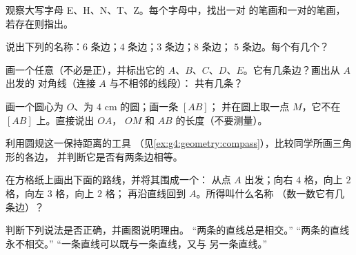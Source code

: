 \begin{exercise}[$\star$]\label{exo:g4:geometry:2}
观察大写字母 E、H、N、T、Z。每个字母中，找出一对
的笔画和一对的笔画，
若存在则指出。
\end{exercise}

\begin{exercise}[$\star$]\label{exo:g4:geometry:3}
说出下列的名称：$6$ 条边；$4$ 条边；$3$ 条边；$8$ 条边；
$5$ 条边。每个有几个\emph{}？
\end{exercise}

\begin{exercise}[$\star$]\label{exo:g4:geometry:4}
画一个任意（不必是正），并标出它的
$A$、$B$、$C$、$D$、$E$。它有几条边？画出从 $A$ 出发的
对角线（连接 $A$ 与不相邻的线段）：
共有几条？
\end{exercise}

\begin{exercise}[$\star$]\label{exo:g4:geometry:5}
画一个圆心为 $O$、为 $4$ cm 的圆；画一条 $[AB]$；
并在圆上取一点 $M$，它不在 $[AB]$ 上。直接说出 $OA$，
$OM$ 和 $AB$ 的长度（不要测量）。
\end{exercise}

\begin{exercise}[$\star$]\label{exo:g4:geometry:6}
利用圆规这一保持距离的工具
（见\cref{ex:g4:geometry:compass}），比较同学所画三角形的各边，
并判断它是否有两条边相等。
\end{exercise}

\begin{exercise}[$\star$]\label{exo:g4:geometry:7}
在方格纸上画出下面的路线，并将其围成一个：
从点 $A$ 出发；向右 $4$ 格，向上 $2$ 格，向左 $3$ 格，向上 $2$ 格；
再沿直线回到 $A$。所得叫什么名称
（数一数它有几条边）？
\end{exercise}

\begin{exercise}[$\star$]\label{exo:g4:geometry:8}
判断下列说法是否正确，并画图说明理由。
“两条的直线总是相交。”
“两条的直线永不相交。”
“一条直线可以既与一条直线，又与
另一条直线。”
\end{exercise}

